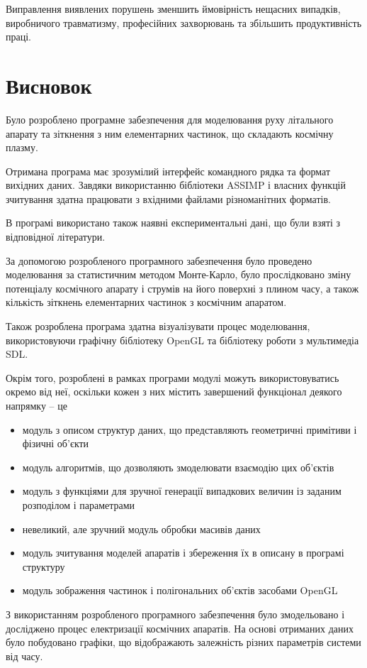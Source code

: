 \documentclass[a4paper,12pt]{article}
\begin{document}
Виправлення виявлених порушень зменшить ймовірність нещасних випадків, виробничого травматизму, професійних захворювань та збільшить продуктивність праці.
\newpage

\section*{Висновок}
Було розроблено програмне забезпечення для моделювання руху літального апарату та зіткнення з ним елементарних частинок, що складають космічну плазму.

Отримана програма має зрозумілий інтерфейс командного рядка та формат вихідних даних. Завдяки використанню бібліотеки ASSIMP і власних функцій зчитування здатна працювати з вхідними файлами різноманітних форматів.

В програмі використано також наявні експериментальні дані, що були взяті з відповідної літератури.

За допомогою розробленого програмного забезпечення було проведено моделювання за статистичним методом Монте-Карло, було прослідковано зміну потенціалу космічного апарату і струмів на його поверхні з плином часу, а також кількість зіткнень елементарних частинок з космічним апаратом.

Також розроблена програма здатна візуалізувати процес моделювання, використовуючи графічну бібліотеку OpenGL та бібліотеку роботи з мультимедіа SDL.

Окрім того, розроблені в рамках програми модулі можуть використовуватись окремо від неї, оскільки кожен з них містить завершений функціонал деякого напрямку -- це
\begin{itemize}
  \item модуль з описом структур даних, що представляють геометричні примітиви і фізичні об’єкти
  \item модуль алгоритмів, що дозволяють змоделювати взаємодію цих об’єктів
  \item модуль з функціями для зручної генерації випадкових величин із заданим розподілом і параметрами
  \item невеликий, але зручний модуль обробки масивів даних
  \item модуль зчитування моделей апаратів і збереження їх в описану в програмі структуру
  \item модуль зображення частинок і полігональних об’єктів засобами OpenGL
\end{itemize}

З використанням розробленого програмного забезпечення було змодельовано і досліджено процес електризації космічних апаратів. На основі отриманих даних було побудовано графіки, що відображають залежність різних параметрів системи від часу.
\end{document}
